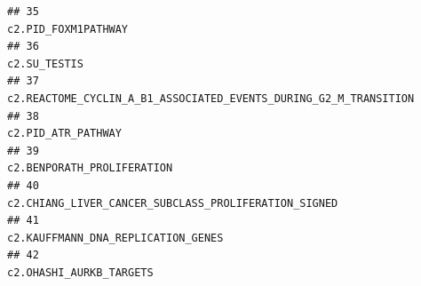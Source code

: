 \documentclass{article}\usepackage[]{graphicx}\usepackage[]{color}
\makeatletter
\newenvironment{kframe}{%
 \def\at@end@of@kframe{}%
 \ifinner\ifhmode%
  \def\at@end@of@kframe{\end{minipage}}%
  \begin{minipage}{\columnwidth}%
 \fi\fi%
 \def\FrameCommand##1{\hskip\@totalleftmargin \hskip-\fboxsep
 \colorbox{shadecolor}{##1}\hskip-\fboxsep
     \hskip-\linewidth \hskip-\@totalleftmargin \hskip\columnwidth}%
 \MakeFramed {\advance\hsize-\width
   \@totalleftmargin\z@ \linewidth\hsize
   \@setminipage}}%
 {\par\unskip\endMakeFramed%
 \at@end@of@kframe}
\newenvironment{knitrout}{}{} %
\makeatother
\begin{document}
\begin{knitrout}
\begin{kframe}
\begin{verbatim}
## 35                                                                                                                                                                                                                                                                                                                                    c2.PID_FOXM1PATHWAY
## 36                                                                                                                                                                                                                                                                                                                                           c2.SU_TESTIS
## 37                                                                                                                                                                                                                                                                                       c2.REACTOME_CYCLIN_A_B1_ASSOCIATED_EVENTS_DURING_G2_M_TRANSITION
## 38                                                                                                                                                                                                                                                                                                                                     c2.PID_ATR_PATHWAY
## 39                                                                                                                                                                                                                                                                                                                             c2.BENPORATH_PROLIFERATION
## 40                                                                                                                                                                                                                                                                                                   c2.CHIANG_LIVER_CANCER_SUBCLASS_PROLIFERATION_SIGNED
## 41                                                                                                                                                                                                                                                                                                                     c2.KAUFFMANN_DNA_REPLICATION_GENES
## 42                                                                                                                                                                                                                                                                                                                                c2.OHASHI_AURKB_TARGETS

\end{verbatim}
\end{kframe}
\end{knitrout}
\end{document}

